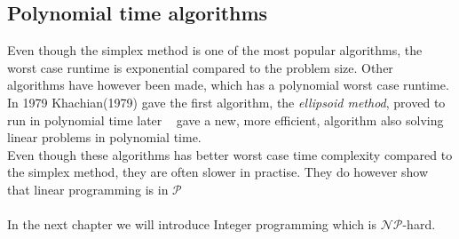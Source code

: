 \subsection{Polynomial time algorithms}
Even though the simplex method is one of the most popular algorithms, the worst case runtime is exponential compared to the problem size. Other algorithms have however been made, which has a polynomial worst case runtime. In 1979 Khachian(1979) gave the first algorithm, the \textit{ellipsoid method}, proved to run in polynomial time later ~\cite{Karmarkar1984} gave a new, more efficient, algorithm also solving linear problems in polynomial time.
\\ Even though these algorithms has better worst case time complexity compared to the simplex method, they are often slower in practise. They do however show that linear programming is in $\mathcal{P}$
\\\\ In the next chapter we will introduce Integer programming which is $\mathcal{NP}$-hard.